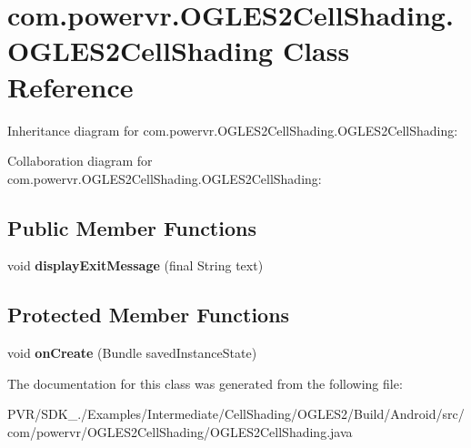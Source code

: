 \hypertarget{classcom_1_1powervr_1_1_o_g_l_e_s2_cell_shading_1_1_o_g_l_e_s2_cell_shading}{\section{com.\+powervr.\+O\+G\+L\+E\+S2\+Cell\+Shading.\+O\+G\+L\+E\+S2\+Cell\+Shading Class Reference}
\label{classcom_1_1powervr_1_1_o_g_l_e_s2_cell_shading_1_1_o_g_l_e_s2_cell_shading}
}


Inheritance diagram for com.\+powervr.\+O\+G\+L\+E\+S2\+Cell\+Shading.\+O\+G\+L\+E\+S2\+Cell\+Shading\+:


Collaboration diagram for com.\+powervr.\+O\+G\+L\+E\+S2\+Cell\+Shading.\+O\+G\+L\+E\+S2\+Cell\+Shading\+:
\subsection*{Public Member Functions}
\begin{DoxyCompactItemize}
\item 
\hypertarget{classcom_1_1powervr_1_1_o_g_l_e_s2_cell_shading_1_1_o_g_l_e_s2_cell_shading_a4332e241a4fa8ea110b500af35465905}{void {\bfseries display\+Exit\+Message} (final String text)}\label{classcom_1_1powervr_1_1_o_g_l_e_s2_cell_shading_1_1_o_g_l_e_s2_cell_shading_a4332e241a4fa8ea110b500af35465905}

\end{DoxyCompactItemize}
\subsection*{Protected Member Functions}
\begin{DoxyCompactItemize}
\item 
\hypertarget{classcom_1_1powervr_1_1_o_g_l_e_s2_cell_shading_1_1_o_g_l_e_s2_cell_shading_a483dd677533cf7b1d04ef9467525fb3b}{void {\bfseries on\+Create} (Bundle saved\+Instance\+State)}\label{classcom_1_1powervr_1_1_o_g_l_e_s2_cell_shading_1_1_o_g_l_e_s2_cell_shading_a483dd677533cf7b1d04ef9467525fb3b}

\end{DoxyCompactItemize}


The documentation for this class was generated from the following file\+:\begin{DoxyCompactItemize}
\item 
P\+V\+R/\+S\+D\+K\+\_./\+Examples/\+Intermediate/\+Cell\+Shading/\+O\+G\+L\+E\+S2/\+Build/\+Android/src/com/powervr/\+O\+G\+L\+E\+S2\+Cell\+Shading/O\+G\+L\+E\+S2\+Cell\+Shading.\+java\end{DoxyCompactItemize}

